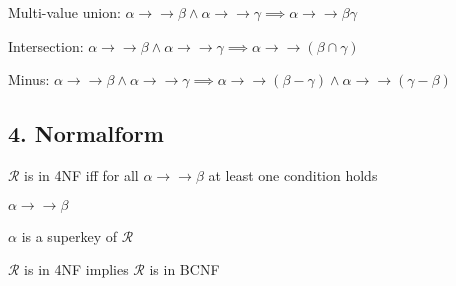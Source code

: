 		\item Multi-value union: $\alpha \rightarrow\rightarrow \beta \land \alpha \rightarrow\rightarrow \gamma \implies \alpha \rightarrow\rightarrow \beta\gamma$
		\item Intersection: $\alpha \rightarrow\rightarrow \beta \land \alpha \rightarrow\rightarrow \gamma \implies \alpha \rightarrow\rightarrow (\beta \cap \gamma)$
		\item Minus: $\alpha \rightarrow\rightarrow \beta \land \alpha \rightarrow\rightarrow \gamma \implies \alpha \rightarrow\rightarrow (\beta - \gamma) \land \alpha \rightarrow\rightarrow (\gamma - \beta)$
	\enumend
\enumend

\subsection{4. Normalform}
\enumstart
	\item $\mathcal{R}$ is in 4NF iff for all $\alpha \rightarrow\rightarrow \beta$ at least one condition holds
	\enumstart
		\item $\alpha \rightarrow\rightarrow \beta$
		\item $\alpha$ is a superkey of $\mathcal{R}$
	\enumend
	\item $\mathcal{R}$ is in 4NF implies $\mathcal{R}$ is in BCNF
\enumend

